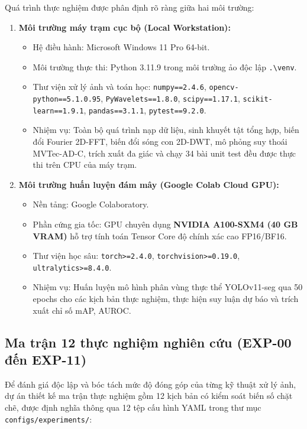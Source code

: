 Quá trình thực nghiệm được phân định rõ ràng giữa hai môi trường:
\begin{enumerate}
    \item \textbf{Môi trường máy trạm cục bộ (Local Workstation):}
    \begin{itemize}
        \item Hệ điều hành: Microsoft Windows 11 Pro 64-bit.
        \item Môi trường thực thi: Python 3.11.9 trong môi trường ảo độc lập \texttt{.\textbackslash venv}.
        \item Thư viện xử lý ảnh và toán học: \texttt{numpy==2.4.6}, \texttt{opencv-python==5.1.0.95}, \texttt{PyWavelets==1.8.0}, \texttt{scipy==1.17.1}, \texttt{scikit-learn==1.9.1}, \texttt{pandas==3.1.1}, \texttt{pytest==9.2.0}.
        \item Nhiệm vụ: Toàn bộ quá trình nạp dữ liệu, sinh khuyết tật tổng hợp, biến đổi Fourier 2D-FFT, biến đổi sóng con 2D-DWT, mô phỏng suy thoái MVTec-AD-C, trích xuất đa giác và chạy 34 bài unit test đều được thực thi trên CPU của máy trạm.
    \end{itemize}
    \item \textbf{Môi trường huấn luyện đám mây (Google Colab Cloud GPU):}
    \begin{itemize}
        \item Nền tảng: Google Colaboratory.
        \item Phần cứng gia tốc: GPU chuyên dụng \textbf{NVIDIA A100-SXM4 (40 GB VRAM)} hỗ trợ tính toán Tensor Core độ chính xác cao FP16/BF16.
        \item Thư viện học sâu: \texttt{torch>=2.4.0}, \texttt{torchvision>=0.19.0}, \texttt{ultralytics>=8.4.0}.
        \item Nhiệm vụ: Huấn luyện mô hình phân vùng thực thể YOLOv11-seg qua 50 epochs cho các kịch bản thực nghiệm, thực hiện suy luận dự báo và trích xuất chỉ số mAP, AUROC.
    \end{itemize}
\end{enumerate}

\subsection{Ma trận 12 thực nghiệm nghiên cứu (EXP-00 đến EXP-11)}

Để đánh giá độc lập và bóc tách mức độ đóng góp của từng kỹ thuật xử lý ảnh, dự án thiết kế ma trận thực nghiệm gồm 12 kịch bản có kiểm soát biến số chặt chẽ, được định nghĩa thông qua 12 tệp cấu hình YAML trong thư mục \texttt{configs/experiments/}:


